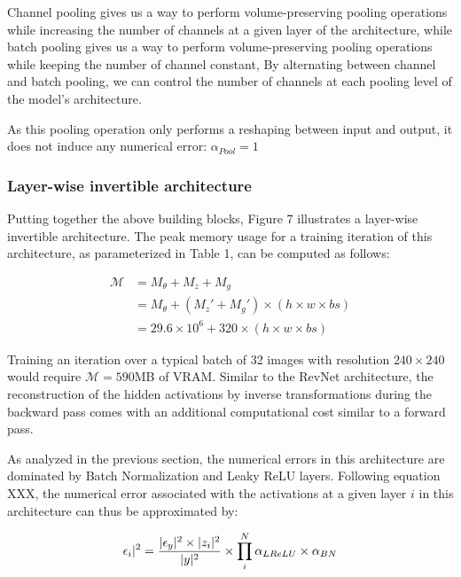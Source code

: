 \documentclass[twocolumn]{bmcart}
\begin{document}
Channel pooling gives us a way to perform volume-preserving pooling operations
while increasing the number of channels at a given layer of the architecture,
while batch pooling gives us a way to perform volume-preserving pooling operations
while keeping the number of channel constant,
By alternating between channel and batch pooling, we can control the number
of channels at each pooling level of the model's architecture.

As this pooling operation only performs a reshaping between input and output,
it does not induce any numerical error: $\alpha_{Pool}=1$

\subsubsection{Layer-wise invertible architecture}

Putting together the above building blocks, Figure 7 illustrates a layer-wise invertible architecture.
The peak memory usage for a training iteration of this architecture, as parameterized in Table 1, can be computed as follows:

\begin{subequations}
\begin{align}
\mathcal{M} &= M_{\theta} + M_{z} + M_{g} \\
            &= M_{\theta} + (M_z' + M_{g}') \times (h \times w \times bs) \\
            &= 29.6 \times 10^6 + 320 \times (h \times w \times bs)
\end{align}
\end{subequations}

Training an iteration over a typical batch of 32 images with resolution $240 \times 240$ would require $\mathcal{M}=590$MB of VRAM.
Similar to the RevNet architecture, the reconstruction of the hidden activations by inverse transformations
during the backward pass comes with an additional computational cost similar to a forward pass.

As analyzed in the previous section, the numerical errors in this architecture are dominated by Batch Normalization and Leaky ReLU layers.
Following equation XXX, the numerical error associated with the activations at a given layer $i$ in this architecture can thus be approximated by:

\begin{equation}
\epsilon_i |^2 =  \frac{| \epsilon_y |^2 \times | z_i |^2}{| y |^2} \times \prod_i^{N} \alpha_{LReLU} \times \alpha_{BN} \\
\end{equation}
\end{document}
